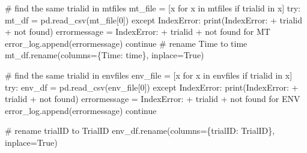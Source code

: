 \documentclass[
  letterpaper,
  DIV=11,
  numbers=noendperiod]{scrreprt}
\newenvironment{Shaded}{\begin{snugshade}}{\end{snugshade}}
\newcommand{\BuiltInTok}[1]{\textcolor[rgb]{0.00,0.23,0.31}{#1}}
\newcommand{\CommentTok}[1]{\textcolor[rgb]{0.37,0.37,0.37}{#1}}
\newcommand{\ControlFlowTok}[1]{\textcolor[rgb]{0.00,0.23,0.31}{#1}}
\newcommand{\DecValTok}[1]{\textcolor[rgb]{0.68,0.00,0.00}{#1}}
\newcommand{\KeywordTok}[1]{\textcolor[rgb]{0.00,0.23,0.31}{#1}}
\newcommand{\NormalTok}[1]{\textcolor[rgb]{0.00,0.23,0.31}{#1}}
\newcommand{\OperatorTok}[1]{\textcolor[rgb]{0.37,0.37,0.37}{#1}}
\newcommand{\PreprocessorTok}[1]{\textcolor[rgb]{0.68,0.00,0.00}{#1}}
\newcommand{\StringTok}[1]{\textcolor[rgb]{0.13,0.47,0.30}{#1}}
\newcommand{\VariableTok}[1]{\textcolor[rgb]{0.07,0.07,0.07}{#1}}
\begin{document}
\begin{Shaded}
\begin{Highlighting}[]
    \CommentTok{\# find the same trialid in mtfiles}
\NormalTok{    mt\_file }\OperatorTok{=}\NormalTok{ [x }\ControlFlowTok{for}\NormalTok{ x }\KeywordTok{in}\NormalTok{ mtfiles }\ControlFlowTok{if}\NormalTok{ trialid }\KeywordTok{in}\NormalTok{ x]}
    \ControlFlowTok{try}\NormalTok{:}
\NormalTok{        mt\_df }\OperatorTok{=}\NormalTok{ pd.read\_csv(mt\_file[}\DecValTok{0}\NormalTok{])}
    \ControlFlowTok{except} \PreprocessorTok{IndexError}\NormalTok{:}
        \BuiltInTok{print}\NormalTok{(}\StringTok{\textquotesingle{}IndexError: \textquotesingle{}} \OperatorTok{+}\NormalTok{ trialid }\OperatorTok{+} \StringTok{\textquotesingle{} not found\textquotesingle{}}\NormalTok{)}
\NormalTok{        errormessage }\OperatorTok{=} \StringTok{\textquotesingle{}IndexError: \textquotesingle{}} \OperatorTok{+}\NormalTok{ trialid }\OperatorTok{+} \StringTok{\textquotesingle{} not found for MT\textquotesingle{}}
\NormalTok{        error\_log.append(errormessage)}
        \ControlFlowTok{continue}
    \CommentTok{\# rename Time to time}
\NormalTok{    mt\_df.rename(columns}\OperatorTok{=}\NormalTok{\{}\StringTok{\textquotesingle{}Time\textquotesingle{}}\NormalTok{: }\StringTok{\textquotesingle{}time\textquotesingle{}}\NormalTok{\}, inplace}\OperatorTok{=}\VariableTok{True}\NormalTok{)}

    \CommentTok{\# find the same trialid in envfiles}
\NormalTok{    env\_file }\OperatorTok{=}\NormalTok{ [x }\ControlFlowTok{for}\NormalTok{ x }\KeywordTok{in}\NormalTok{ envfiles }\ControlFlowTok{if}\NormalTok{ trialid }\KeywordTok{in}\NormalTok{ x]}
    \ControlFlowTok{try}\NormalTok{:}
\NormalTok{        env\_df }\OperatorTok{=}\NormalTok{ pd.read\_csv(env\_file[}\DecValTok{0}\NormalTok{])}
    \ControlFlowTok{except} \PreprocessorTok{IndexError}\NormalTok{:}
        \BuiltInTok{print}\NormalTok{(}\StringTok{\textquotesingle{}IndexError: \textquotesingle{}} \OperatorTok{+}\NormalTok{ trialid }\OperatorTok{+} \StringTok{\textquotesingle{} not found\textquotesingle{}}\NormalTok{)}
\NormalTok{        errormessage }\OperatorTok{=} \StringTok{\textquotesingle{}IndexError: \textquotesingle{}} \OperatorTok{+}\NormalTok{ trialid }\OperatorTok{+} \StringTok{\textquotesingle{} not found for ENV\textquotesingle{}}
\NormalTok{        error\_log.append(errormessage)}
        \ControlFlowTok{continue}
    
    \CommentTok{\# rename trialID to TrialID}
\NormalTok{    env\_df.rename(columns}\OperatorTok{=}\NormalTok{\{}\StringTok{\textquotesingle{}trialID\textquotesingle{}}\NormalTok{: }\StringTok{\textquotesingle{}TrialID\textquotesingle{}}\NormalTok{\}, inplace}\OperatorTok{=}\VariableTok{True}\NormalTok{)}


\end{Highlighting}
\end{Shaded}
\end{document}
